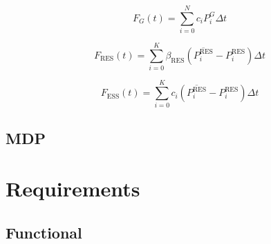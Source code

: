 \begin{equation} \label{eq:conv-cost}
	F_G(t) = \sum^N_{i=0} c_i P^G_i \Delta t
\end{equation}

\begin{equation} \label{eq:res-cost}
	F_\text{RES}(t) = \sum^K_{i=0} \beta_\text{RES} (\overline{P^\text{RES}_i} - P^\text{RES}_i) \Delta t 
\end{equation}

\begin{equation} \label{eq:ess-cost}
	F_\text{ESS}(t) = \sum^K_{i=0} c_i (\overline{P^\text{RES}_i} - P^\text{RES}_i) \Delta t 
\end{equation}



\subsection{\acf{MDP}}

\section{Requirements}  \label{sec:requirements}

\subsection{Functional}

